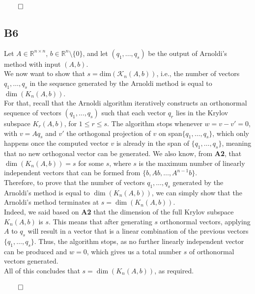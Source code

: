 \documentclass[a4paper,10pt]{article}
\begin{document}
\begin{flushright}
    $\qed$
\end{flushright}

\subsection*{B6}
Let $A \in \mathbb{R}^{n \times n}$, $b \in \mathbb{R}^n \setminus \{0\}$, and let $(q_1,...,q_s)$ be the output of Arnoldi's method with input $(A,b)$.\\
We now want to show that $s = \text{dim}(\mathcal{K}_n(A,b))$, i.e., the number of vectors \( q_1, \dots, q_s \) in the sequence generated by the Arnoldi method is equal to \( \dim(K_n(A, b)) \).\\

For that, recall that the Arnoldi algorithm iteratively constructs an orthonormal sequence of vectors $(q_1,...,q_s)$ such that each vector \( q_r \) lies in the Krylov subspace \( K_r(A, b) \), for $1\leq r \leq s$. The algorithm stops whenever \( w = v - v' = 0 \), with \( v = A q_s \) and \( v' \) the orthogonal projection of \( v \) on span\( \{q_1, \dots, q_s\} \), which only happens once the computed vector \( v \) is already in the span of \( \{q_1, \dots, q_s\} \), meaning that no new orthogonal vector can be generated. We also know, from \textbf{A2}, that \( \dim(K_n(A, b)) = s \) for some \( s \), where \( s \) is the maximum number of linearly independent vectors that can be formed from \( \{b, Ab, \dots, A^{n-1}b\} \).\\

Therefore, to prove that the number of vectors \( q_1, \dots, q_s \) generated by the Arnoldi's method is equal to \( \dim(K_n(A, b)) \), we can simply show that the Arnoldi's method terminates at \( s=\dim(K_n(A, b)) \).\\
Indeed, we said based on \textbf{A2} that the dimension of the full Krylov subspace \( K_n(A, b) \) is \( s \). This means that after generating \( s \) orthonormal vectors, applying \( A \) to \( q_s \) will result in a vector that is a linear combination of the previous vectors \( \{q_1, \dots, q_s\} \). Thus, the algorithm stops, as no further linearly independent vector can be produced and $w = 0$, which gives us a total number $s$ of orthonormal vectors generated. \\
All of this concludes that \( s = \dim(K_n(A, b)) \), as required.

\begin{flushright}
    $\qed$
\end{flushright}
\end{document}
